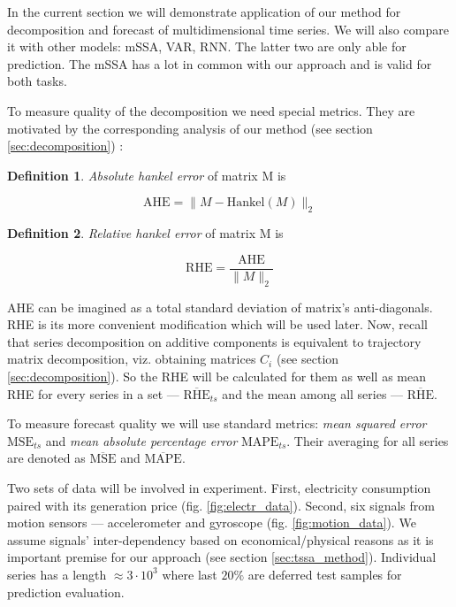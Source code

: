 \documentclass[referee, pdflatex]{sn-jnl}
\theoremstyle{definition}
\newtheorem*{Def}{Definition}
\theoremstyle{plain}
\begin{document}
	In the current section we will demonstrate application of our method for decomposition and forecast of multidimensional time series. We will also compare it with other models: mSSA, VAR, RNN. The latter two are only able for prediction. The mSSA has a lot in common with our approach and is valid for both tasks.
	
	To measure quality of the decomposition we need special metrics. They are motivated by the corresponding analysis of our method (see section \ref{sec:decomposition}) :
	
	\begin{Def}
		\emph{Absolute hankel error} of matrix M is 
		
		\[
		\text{AHE} = \lVert M - \text{Hankel}(M) \rVert_2
		\] 
		
	\end{Def}	
	
	\begin{Def}		
		
		\emph{Relative hankel error} of matrix M is 
		
		\[
		\text{RHE} = \frac{\text{AHE}}{\lVert M \rVert_2} 
		\] 		
		
	\end{Def}
	
	AHE can be imagined as a total standard deviation of matrix's anti-diagonals. RHE is its more convenient modification which will be used later.	Now, recall that series decomposition on additive components is equivalent to trajectory matrix decomposition, viz. obtaining matrices $ C_i $ (see section \ref{sec:decomposition}). So the RHE will be calculated for them as well as mean RHE for every series in a set --- $ \overline{\text{RHE}}_{ts} $ and the mean among all series --- $ \overline{\text{RHE}} $. 
	
	To measure forecast quality we will use standard metrics: \emph{mean squared error} $ \text{MSE}_{ts} $ and \emph{mean absolute percentage error} $ \text{MAPE}_{ts} $. Their averaging for all series are denoted as $ \overline{\text{MSE}} $ and $ \overline{\text{MAPE}} $.
	
	Two sets of data will be involved in experiment. First, electricity consumption paired with its generation price (fig. \ref{fig:electr_data}). Second, six signals from motion sensors --- accelerometer and gyroscope (fig. \ref{fig:motion_data}). We assume signals' inter-dependency based on economical/physical reasons as it is important premise for our approach (see section \ref{sec:tssa_method}). Individual series has a length $ \approx 3 \cdot 10^3 $ where last $ 20\% $ are deferred test samples for prediction evaluation.
	
\end{document}
